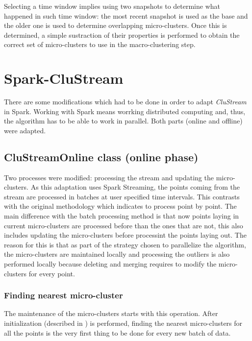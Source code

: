 \documentclass[10pt, conference, compsocconf]{IEEEtran}
\begin{document}
Selecting a time window implies using two snapshots to determine what happened in such time window: the most recent snapshot is used as the base and the older one is used to determine overlapping micro-clusters. Once this is determined, a simple sustraction of their properties is performed to obtain the correct set of micro-clusters to use in the macro-clustering step.

\section{Spark-CluStream}

There are some modifications which had to be done in order to adapt \textit{CluStream} in Spark. Working with Spark means worrking distributed computing and, thus, the algorithm has to be able to work in parallel. Both parts (online and offline) were adapted.

\subsection{CluStreamOnline class (online phase)}

Two processes were modified: processing the stream and updating the micro-clusters. As this adaptation uses Spark Streaming, the points coming from the stream are processed in batches at user specified time intervals. This contrasts with the original methodology which indicates to process point by point. The main difference with the batch processing method is that now points laying in current micro-clusters are processed before than the ones that are not, this also includes updating the micro-clusters before processint the points laying out. The reason for this is that as part of the strategy chosen to parallelize the algorithm, the micro-clusters are maintained locally and processing the outliers is also performed locally because deleting and merging requires to modify the micro-clusters for every point.

\subsubsection{Finding nearest micro-cluster}

The maintenance of the micro-clusters starts with this operation. After initialization (described in \cite{clustreamOrig}) is performed, finding the nearest micro-clusters for all the points is the very first thing to be done for every new batch of data.
\end{document}
